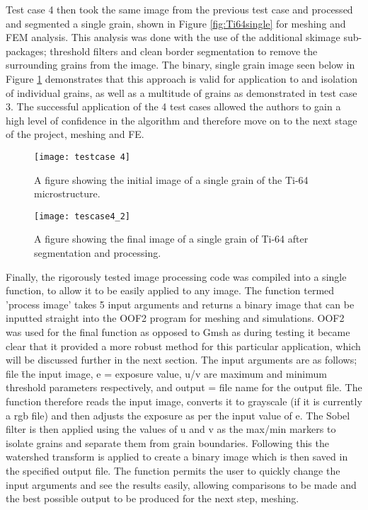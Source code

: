 \documentclass[\report.tex]{subfiles}
\begin{document}
\noindent Test case 4 then took the same image from the previous test case and processed and segmented a single grain, shown in Figure \ref{fig:Ti64single} for meshing and FEM analysis. This analysis was done with the use of the additional skimage sub-packages; threshold filters and clean border segmentation to remove the surrounding grains from the image. The binary, single grain image seen below in Figure \ref{fig:Ti64single2} demonstrates that this approach is valid for application to and isolation of individual grains, as well as a multitude of grains as demonstrated in test case 3. The successful application of the 4 test cases allowed the authors to gain a high level of confidence in the algorithm and therefore move on to the next stage of the project, meshing and FE.\\

\begin{figure}[!htb]
  \centering
  \begin{minipage}[!htb]{.5\textwidth}
    \centering\captionsetup{width=.8\linewidth}%
    \texttt{[image: testcase 4]}
    \caption{A figure showing the initial image of a single grain of the Ti-64 microstructure.}\label{fig:Ti64single}
  \end{minipage}%
  \begin{minipage}[!htb]{.5\textwidth}
    \centering\captionsetup{width=.8\linewidth}%
    \texttt{[image: tescase4\_2]}
    \caption{A figure showing the final image of a single grain of Ti-64 after segmentation and processing.}\label{fig:Ti64single2}
  \end{minipage}
\end{figure}

\noindent Finally, the rigorously tested image processing code was compiled into a single function, to allow it to be easily applied to any image. The function termed 'process image' takes 5 input arguments and returns a binary image that can be inputted straight into the OOF2 program for meshing and simulations. OOF2 was used for the final function as opposed to Gmsh as during testing it became clear that it provided a more robust method for this particular application, which will be discussed further in the next section. The input arguments are as follows; file \= the input image, e = exposure value, u/v are maximum and minimum threshold parameters respectively, and output = file name for the output file. The function therefore reads the input image, converts it to grayscale (if it is currently a rgb file) and then adjusts the exposure as per the input value of e. The Sobel filter is then applied using the values of u and v as the max/min markers to isolate grains and separate them from grain boundaries. Following this the watershed transform is applied to create a binary image which is then saved in the specified output file. The function permits the user to quickly change the input arguments and see the results easily, allowing comparisons to be made and the best possible output to be produced for the next step, meshing.
\end{document}
